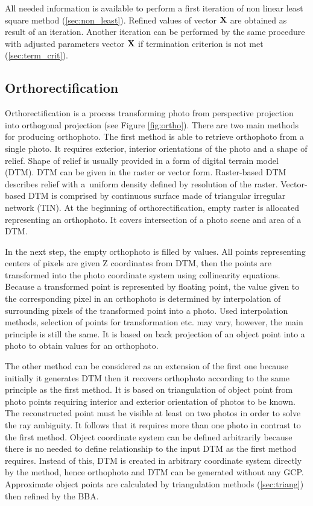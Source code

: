 \documentclass[a4paper,12pt]{article}
\newcommand{\evect}[1]{%
{\bf #1}%
}
\begin{document}
All needed information is available to perform a first iteration of non linear least square 
method (\ref{sec:non_least}).  Refined values of vector  $\evect{X}$ are obtained as result of an iteration. 
Another iteration can be  performed by the same procedure  with adjusted parameters vector $\evect{X}$
if termination criterion is not met (\ref{sec:term_crit}).

\subsection{Orthorectification}
\label{sec:ortho}

Orthorectification is a process transforming photo from perspective projection into orthogonal projection (see Figure \ref{fig:ortho}). 
There are two main methods for producing orthophoto. The first method is able to retrieve orthophoto 
from a single photo. It requires exterior, interior orientations of the photo and a shape of relief. 
Shape of relief is usually provided in a form of digital terrain model (DTM). DTM 
can be given in the raster or vector form. Raster-based DTM describes relief with a~uniform density defined 
by resolution of the raster.
Vector-based DTM is comprised by continuous surface made of triangular irregular network (TIN). 
At the beginning of orthorectification, empty raster is allocated representing an orthophoto.
It covers intersection of a photo scene and area of a DTM.

In the next step, the empty orthophoto is filled by values. 
All points representing centers of pixels are given Z coordinates from DTM,
then the points are transformed into the photo coordinate system using collinearity equations.
Because a transformed point is represented by floating point, the value given 
to the corresponding pixel in an orthophoto is determined by interpolation of surrounding pixels of the transformed 
point into a photo.  Used interpolation methods, selection of points 
for transformation etc. may vary, however, 
 the main principle is still the same. It is based on back projection of  an object point into 
a photo to obtain values for an orthophoto.


The other method can be considered as an extension of the first one because initially it generates DTM then it recovers orthophoto 
according to the same principle as the first method. It is based on triangulation of object point
from photo points requiring interior and exterior orientation of photos to be known. The reconstructed point 
must be visible at least on two photos in order to solve the ray ambiguity. It follows that it requires more than 
one photo in contrast to the first method.
Object coordinate system 
can be defined arbitrarily because there is no needed to define relationship to the input DTM as the first method requires.
Instead of this, DTM is created in arbitrary coordinate system directly by the method,
hence orthophoto and DTM can be generated without any GCP. 
Approximate object points  are calculated by triangulation 
methods (\ref{sec:triang}) then refined by the BBA. 
\end{document}
